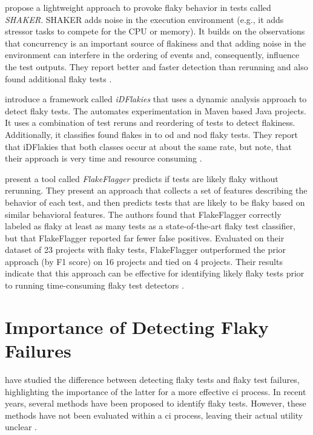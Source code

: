  propose a lightweight approach to provoke flaky behavior in tests called \emph{SHAKER}.
SHAKER adds noise in the execution environment (e.g., it adds stressor tasks to compete for the CPU or memory). 
It builds on the observations that concurrency is an important source of flakiness and that adding noise in the environment can interfere in the ordering of events and, consequently, influence the test outputs. 
They report better and faster detection than rerunning and also found additional flaky tests \autocite{silva_shake_2020}.

 introduce a framework called \emph{iDFlakies} that uses a dynamic analysis approach to detect flaky tests.
The automates experimentation in Maven based Java projects.
It uses a combination of test reruns and reordering of tests to detect flakiness.
Additionally, it classifies found flakes in to \ac{od} and \ac{nod} flaky tests.
They report that iDFlakies that both classes occur at about the same rate, but note, that their approach is very time and resource consuming \autocite{lam_idflakies_2019}.

 present a tool called \emph{FlakeFlagger} predicts if tests are likely flaky without rerunning.
They present an approach that collects a set of features describing the behavior of each test, and then predicts tests that are likely to be flaky based on similar behavioral features. 
The authors found that FlakeFlagger correctly labeled as flaky at least as many tests as a state-of-the-art flaky test classifier, but that FlakeFlagger reported far fewer false positives. 
Evaluated on their dataset of 23 projects with flaky tests, FlakeFlagger outperformed the prior approach (by F1 score) on 16 projects and tied on 4 projects. 
Their results indicate that this approach can be effective for identifying likely flaky tests prior to running time-consuming flaky test detectors \autocite{alshammari_flakeflagger_2021}.

\section{Importance of Detecting Flaky Failures}
 have studied the difference between detecting flaky tests and flaky test failures, highlighting the importance of the latter for a more effective \ac{ci} process.
In recent years, several methods have been proposed to identify flaky tests.
However, these methods have not been evaluated within a \ac{ci} process, leaving their actual utility unclear \autocite{haben_importance_2023}.

